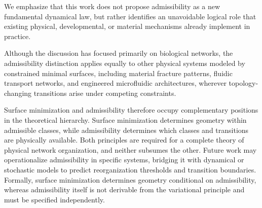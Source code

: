 We emphasize that this work does not propose admissibility as a new fundamental dynamical law, but rather identifies an unavoidable logical role that existing physical, developmental, or material mechanisms already implement in practice.

Although the discussion has focused primarily on biological networks, the admissibility distinction applies equally to other physical systems modeled by constrained minimal surfaces, including material fracture patterns, fluidic transport networks, and engineered microfluidic architectures, wherever topology-changing transitions arise under competing constraints.

Surface minimization and admissibility therefore occupy complementary positions in the theoretical hierarchy. Surface minimization determines geometry within admissible classes, while admissibility determines which classes and transitions are physically available. Both principles are required for a complete theory of physical network organization, and neither subsumes the other. Future work may operationalize admissibility in specific systems, bridging it with dynamical or stochastic models to predict reorganization thresholds and transition boundaries. Formally, surface minimization determines geometry conditional on admissibility, whereas admissibility itself is not derivable from the variational principle and must be specified independently.
